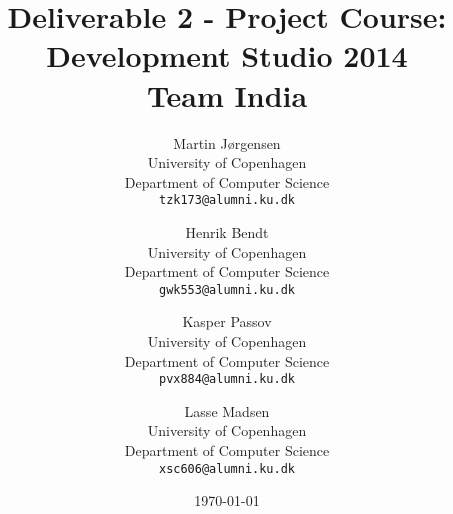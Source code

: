 \documentclass[a4paper,11pt]{article}
\title{Deliverable 2 - Project Course: Development Studio 2014 \\ Team India}
\author
{
    Martin Jørgensen \\
    University of Copenhagen \\
    Department of Computer Science \\
    {\tt tzk173@alumni.ku.dk}
    \and
    Henrik Bendt \\
    University of Copenhagen \\
    Department of Computer Science \\
    {\tt gwk553@alumni.ku.dk}
    \and
    Kasper Passov \\
    University of Copenhagen \\
    Department of Computer Science \\
    {\tt pvx884@alumni.ku.dk}
    \and
    Lasse Madsen \\
    University of Copenhagen \\
    Department of Computer Science \\
    {\tt xsc606@alumni.ku.dk}
}
\date{\today}
\begin{document}
\maketitle

\tableofcontents
\pagebreak





\end{document}
